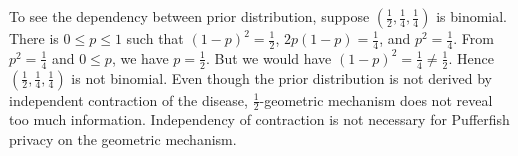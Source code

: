 To see the dependency between prior distribution, suppose $(\frac{1}{2}, \frac{1}{4},
\frac{1}{4})$ is binomial. There is $0 \leq p \leq 1$ such that
$(1-p)^2 = \frac{1}{2}$, $2p(1-p) = \frac{1}{4}$, and $p^2 =
\frac{1}{4}$. From $p^2 = \frac{1}{4}$ and $0 \leq p$, we have $p =
\frac{1}{2}$. But we would have $(1-p)^2 = \frac{1}{4} \neq
\frac{1}{2}$. Hence $(\frac{1}{2}, \frac{1}{4}, \frac{1}{4})$ is not
binomial. Even though the prior distribution is not derived by
independent contraction of the disease, $\frac{1}{2}$-geometric
mechanism does not reveal too much information. Independency of
contraction is not necessary for Pufferfish privacy on the geometric
mechanism.

